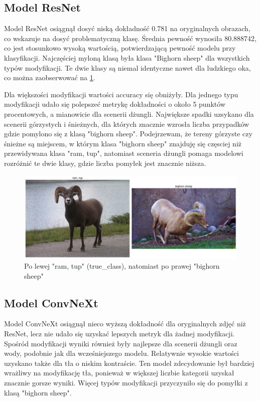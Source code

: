 \subsection*{Model ResNet}

Model ResNet osiągnął dosyć niską dokładność 0.781 na oryginalnych obrazach, co wskazuje na dosyć problematyczną klasę. Średnia pewność wynosiła 80.888742, co jest stosunkowo wysoką wartością, potwierdzającą pewność modelu przy klasyfikacji. Najczęściej myloną klasą była klasa 
"Bighorn sheep" dla wszystkich typów modyfikacji. Te dwie klasy są niemal identyczne nawet dla ludzkiego oka, co można zaobserwować na \ref*{rys:348}.

Dla większości modyfikacji wartości accuracy się obniżyły. Dla jednego typu modyfikacji udało się polepszeć metrykę dokładności o około 5 punktów procentowych, a mianowicie dla scenerii dżungli. Największe spadki uzsykano dla scenerii górzystych i śnieżnych, dla których znacznie wzrosła
liczba przypadków gdzie pomylono się z klasą "bighorn sheep". Podejrzewam, że tereny górzyste czy śnieżne są miejscem, w którym klasa "bighorn sheep" znajduję się częsciej niż przewidywana klasa "ram, tup", natomiast sceneria dżungli pomaga modelowi rozróżnić te dwie klasy, gdzie
liczba pomyłek jest znacznie niższa.


\begin{figure}
	\centering\includegraphics[width=.9\textwidth]{img/348}
	\caption{Po lewej "ram, tup" (true\_class), natomiast po prawej "bighorn sheep"}
	\label{rys:348}
\end{figure}

\subsection*{Model ConvNeXt}

Model ConvNeXt osiągnął nieco wyższą dokładność dla oryginalnych zdjęć niż ResNet, lecz nie udało się uzyskać lepszych metryk dla żadnej modyfikacji. Spośród modyfikacji wyniki również były najlepsze dla scenerii dżungli oraz wody, podobnie jak dla wcześniejszego modelu. Relatywnie 
wysokie wartości uzyskano także dla tła o niskim kontraście. Ten model zdecydowanie był bardziej wrażliwy na modyfikację tła, ponieważ w większej liczbie kategorii uzyskał znacznie gorsze wyniki. Więcej typów modyfikacji przyczyniło się do pomyłki z klasą "bighorn sheep". 

